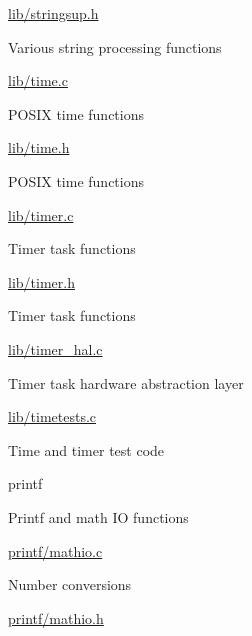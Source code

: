 \begin{DoxyItemize}
\begin{DoxyItemize}
\begin{DoxyItemize}
\end{DoxyItemize}
\item \hyperlink{stringsup_8h}{lib/stringsup.\+h}
\begin{DoxyItemize}
\item Various string processing functions
\end{DoxyItemize}
\item \hyperlink{time_8c}{lib/time.\+c}
\begin{DoxyItemize}
\item P\+O\+S\+IX time functions
\end{DoxyItemize}
\item \hyperlink{time_8h}{lib/time.\+h}
\begin{DoxyItemize}
\item P\+O\+S\+IX time functions
\end{DoxyItemize}
\item \hyperlink{timer_8c}{lib/timer.\+c}
\begin{DoxyItemize}
\item Timer task functions
\end{DoxyItemize}
\item \hyperlink{timer_8h}{lib/timer.\+h}
\begin{DoxyItemize}
\item Timer task functions
\end{DoxyItemize}
\item \hyperlink{timer__hal_8c}{lib/timer\+\_\+hal.\+c}
\begin{DoxyItemize}
\item Timer task hardware abstraction layer
\end{DoxyItemize}
\item \hyperlink{timetests_8c}{lib/timetests.\+c}
\begin{DoxyItemize}
\item Time and timer test code
\end{DoxyItemize}
\end{DoxyItemize}
\item printf
\begin{DoxyItemize}
\item Printf and math IO functions
\item \hyperlink{mathio_8c}{printf/mathio.\+c}
\begin{DoxyItemize}
\item Number conversions
\end{DoxyItemize}
\item \hyperlink{mathio_8h}{printf/mathio.\+h}

\end{DoxyItemize}
\end{DoxyItemize}
